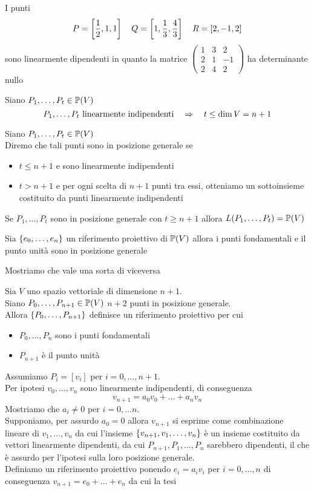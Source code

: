 \begin{ese} I punti
$$  P=\left[\frac{1}{2},1,1\right]\quad Q  =\left[ 1,\frac{1}{3}, \frac{4}{3} \right] \quad R = [2,-1, 2]$$ 
sono linearmente dipendenti in quanto la matrice
$ \begin{pmatrix}
 1&3 & 2\\
 2&1 & -1\\ 
 2&4 & 2
\end{pmatrix}$ ha determinante nullo
\end{ese}
\spazio
\begin{oss}Siano $P_1, \dots,P_t\in \mathbb{P}(V)$
$$ P_1,\dots, P_t\text{ linearmente indipendenti} \quad \Rightarrow\quad t\leq \dim V = n+1$$
\end{oss}
\spazio
\begin{defn}Siano $P_1, \dots, P_t\in \mathbb{P}(V)$\\
Diremo che tali punti sono in posizione generale se 
\begin{itemize}
\item $t\leq n+1$ e sono linearmente indipendenti
\item $t>n+1$ e per ogni scelta di $n+1$ punti tra essi, otteniamo un sottoinsieme costituito da punti linearmente indipendenti 
\end{itemize}
\end{defn}
\begin{oss}Se $P_1, \dots, P_t$ sono in posizione generale con $t\geq n+1$ allora $L(P_1, \dots, P_t) = \mathbb{P}(V)$
\end{oss}
\begin{oss}Sia $\left\{ e_0, \dots, e_n \right\}$ un riferimento proiettivo di $\mathbb{P}(V)$ allora i punti fondamentali e il punto unit\`a sono in posizione generale 
\end{oss}
Mostriamo che vale una sorta di viceversa
\begin{lem}Sia $V$ uno spazio vettoriale di dimensione $n+1$.\\
Siano $P_0, \dots, P_{n+1}\in \mathbb{P}(V)$ $n+2$ punti in posizione generale.\\
Allora $\left\{ P_0, \dots, P_{n+1} \right\}$ definisce un riferimento proiettivo per cui
\begin{itemize}
\item $P_0, \dots, P_n$ sono i punti fondamentali
\item $P_{n+1}$ \`e il punto unit\`a 
\end{itemize} 
\proof Assumiamo $P_i = [v_i]$ per $i=0, \dots, n+1$.\\
Per ipotesi $v_0, \dots, v_n$ sono linearmente indipendenti, di conseguenza
$$ v_{n+1} = a_0 v_0+\dots + a_n v_n$$
Mostriamo che $a_i \neq 0 $ per $i=0, \dots n$.\\
Supponiamo, per assurdo $a_0=0$ allora $v_{n+1}$ si esprime come combinazione lineare di $v_1, \dots, v_n$ da cui l'insieme $\left\{ v_{n+1}, v_1, \dots, v_n \right\}$ \`e un insieme costituito da vettori linearmente dipendenti, da  cui $P_{n+1},P_1, \dots, P_n $ sarebbero dipendenti, il che \`e assurdo per l'ipotesi sulla loro posizione generale.\\
Definiamo un riferimento proiettivo ponendo $e_i= a_i v_i$ per $i=0, \dots, n$ di conseguenza $v_{n+1} = e_0+\dots+ e_n$ da cui la tesi 
\end{lem}

